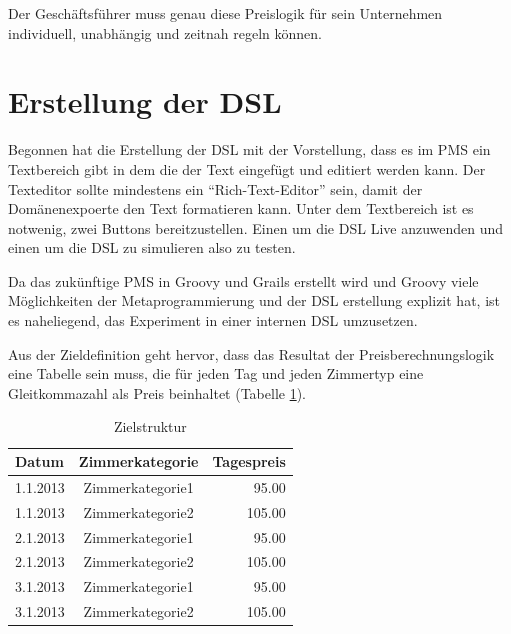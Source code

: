 \documentclass[11pt,english,ngerman, headsepline]{scrreprt}
\begin{document}
Der Geschäftsführer muss genau diese Preislogik für
sein Unternehmen individuell, unabhängig und zeitnah regeln können.

\section{Erstellung der DSL}\label{erstellungDSL}
Begonnen hat die Erstellung der DSL mit der Vorstellung, dass es im PMS ein
Textbereich gibt in dem die der Text eingefügt und editiert werden kann.
Der Texteditor sollte mindestens ein ``Rich-Text-Editor'' sein, damit der
Domänenexpoerte den Text formatieren kann.
Unter dem Textbereich ist es notwenig, zwei Buttons bereitzustellen. Einen um
die DSL Live anzuwenden und einen um die DSL zu simulieren also zu testen.

Da das zukünftige PMS in Groovy und Grails erstellt wird und Groovy viele
Möglichkeiten der Metaprogrammierung und der DSL erstellung explizit hat, ist es
naheliegend, das Experiment in einer internen DSL umzusetzen. 

Aus der Zieldefinition geht hervor, dass das Resultat der Preisberechnungslogik
eine Tabelle sein muss, die für jeden Tag und jeden Zimmertyp eine Gleitkommazahl als
Preis beinhaltet (Tabelle \ref{zielDefinition}).  

\begin{table}[htpb]
  \centering
  \begin{tabular}{| l | c | r |} 
 	\hline 
  	Datum & Zimmerkategorie & Tagespreis \\
  	\hline 
	1.1.2013 &  Zimmerkategorie1 &  95.00 \\
	1.1.2013 &  Zimmerkategorie2 &  105.00 \\
	2.1.2013 &  Zimmerkategorie1 &  95.00 \\
	2.1.2013 &  Zimmerkategorie2 &  105.00 \\
	3.1.2013 &  Zimmerkategorie1 &  95.00 \\
	3.1.2013 &  Zimmerkategorie2 &  105.00 \\
	\hline 
  	\end{tabular}  
 	\caption{Zielstruktur}
  \label{zielDefinition}
\end{table}	 
\end{document}
